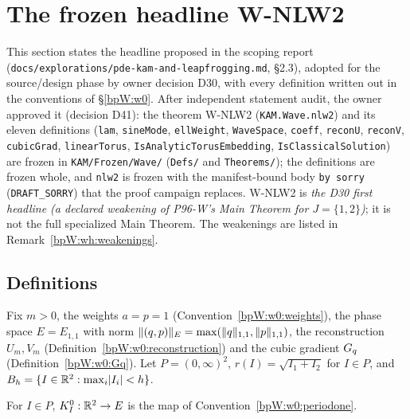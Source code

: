 \section{The frozen headline W-NLW2}\label{bpW:wh}

\par{}\par

This section states the headline proposed in the scoping report (\texttt{docs/explorations/}\allowbreak\texttt{pde-kam-and-leapfrogging.md}, \S2.3), adopted
for the source/design phase by owner decision D30, with every definition written out in the conventions of
\S\ref{bpW:w0}. After independent statement audit, the owner approved it (decision D41): the theorem W-NLW2
(\texttt{KAM.Wave.nlw2}) and its eleven definitions (\texttt{lam}, \texttt{sineMode}, \texttt{ellWeight},
\texttt{WaveSpace}, \texttt{coeff}, \texttt{reconU}, \texttt{reconV}, \texttt{cubicGrad}, \texttt{linearTorus},
\texttt{IsAnalyticTorusEmbedding}, \texttt{IsClassicalSolution}) are frozen in \texttt{KAM/Frozen/Wave/}
(\texttt{Defs/} and \texttt{Theorems/}); the definitions are frozen whole, and \texttt{nlw2} is frozen with the
manifest-bound body \texttt{by sorry} (\texttt{DRAFT\_SORRY}) that the proof campaign replaces. W-NLW2 is
\emph{the D30 first headline (a declared weakening of P96-W's Main Theorem for $J=\{1,2\}$)}; it is not the full
specialized Main Theorem. The weakenings are listed in Remark~\ref{bpW:wh:weakenings}.

\subsection{Definitions}\label{bpW:wh:defs}

Fix $m>0$, the weights $a=p=1$ (Convention~\ref{bpW:w0:weights}), the phase space $E=E_{1,1}$ with norm
$\lVert (q,p)\rVert_E=\max(\lVert q\rVert_{1,1},\lVert p\rVert_{1,1})$, the reconstruction $U_m,V_m$
(Definition~\ref{bpW:w0:reconstruction}) and the cubic gradient $G_q$ (Definition~\ref{bpW:w0:Gq}). Let
$P=(0,\infty)^2$, $r(I)=\sqrt{I_1+I_2}$ for $I\in P$, and $B_h=\{I\in\mathbb{R}^2:\max_i\lvert I_i\rvert<h\}$.

\begin{definition}\label{bpW:wh:lintorus}
For $I\in P$, $K^0_I:\mathbb{R}^2\to E$ is the map of Convention~\ref{bpW:w0:periodone}.
\end{definition}

